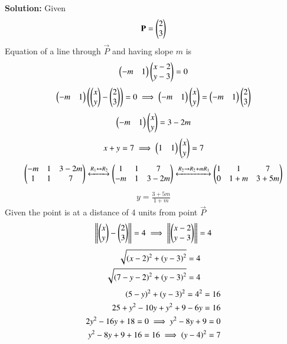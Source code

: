 \documentclass[journal]{IEEEtran}
\begin{document}
\textbf{Solution:}  
Given  
\begin{align}
\mathbf{P}=\begin{pmatrix}2\\3\end{pmatrix}
\end{align}
Equation of a line through $\vec{P}$ and having slope $m$ is
\begin{align}
 \begin{pmatrix}-m & 1\end{pmatrix}\begin{pmatrix}x-2 \\ y-3\end{pmatrix}=0  
 \end{align}
 \begin{align}
 \begin{pmatrix}-m & 1\end{pmatrix}\left(\begin{pmatrix}x\\y\end{pmatrix}-\begin{pmatrix}2\\3\end{pmatrix}\right)=0 \implies \begin{pmatrix}-m & 1\end{pmatrix}\begin{pmatrix}x\\y\end{pmatrix}=\begin{pmatrix}-m & 1\end{pmatrix}\begin{pmatrix}2\\3\end{pmatrix}
\end{align}
\begin{align}
\begin{pmatrix}-m & 1\end{pmatrix}\begin{pmatrix}x\\y\end{pmatrix}=3-2m
\end{align}
\begin{align}
  x+y=7 \implies  \begin{pmatrix}1 & 1\end{pmatrix}\begin{pmatrix}x\\y\end{pmatrix}=7
\end{align}
\begin{align}
\begin{pmatrix}-m & 1 & 3-2m \\ 1 &1 & 7\end{pmatrix} \xleftrightarrow{R_1\leftrightarrow R_2} \begin{pmatrix}1 &1 & 7 \\ -m & 1 & 3-2m\end{pmatrix} \xleftrightarrow{R_2\rightarrow R_2+mR_1} 
\begin{pmatrix}1 & 1& 7 \\0 & 1+m & 3+5m\end{pmatrix}
\end{align}
\begin{align}
y=\frac{3+5m}{1+m}
\end{align}
Given the point is at a distance of 4 units from point $\vec{P}$
\begin{align}
  \left\lVert\begin{pmatrix}x\\y\end{pmatrix}-\begin{pmatrix}2\\3\end{pmatrix}\right\rVert=4 \implies \left\lVert\begin{pmatrix}x-2\\y-3\end{pmatrix}\right\rVert=4
\end{align}
\begin{align}
\sqrt{\left(x-2\right)^2+{\left(y-3\right)^2}}=4  \\
\sqrt{\left(7-y-2\right)^2+{\left(y-3\right)^2}}=4  
\end{align}
\begin{align}
\left(5-y\right)^2+{\left(y-3\right)^2}=4^2=16 \\
25+y^2-10y+y^2+9-6y=16 \\
2y^2-16y+18=0 \implies y^2-8y+9=0 \\
y^2-8y+9+16=16 \implies \left(y-4\right)^2=7 
\end{align}
\end{document}
